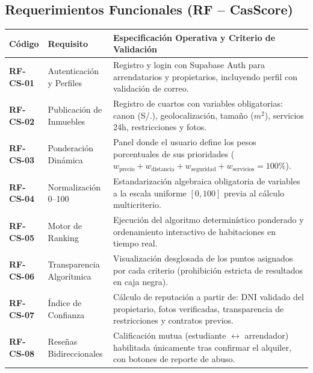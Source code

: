 \documentclass[11pt,a4paper]{article}
\begin{document}
\subsection{Requerimientos Funcionales (RF -- CasScore)}
\noindent\begin{tabularx}{\textwidth}{p{2.3cm} p{4.6cm} X}
\toprule
\textbf{Código} & \textbf{Requisito} & \textbf{Especificación Operativa y Criterio de Validación} \\
\midrule
\textbf{RF-CS-01} & Autenticación y Perfiles & Registro y login con Supabase Auth para arrendatarios y propietarios, incluyendo perfil con validación de correo. \\
\addlinespace[3pt]
\textbf{RF-CS-02} & Publicación de Inmuebles & Registro de cuartos con variables obligatorias: canon (S/.), geolocalización, tamaño ($m^2$), servicios 24h, restricciones y fotos. \\
\addlinespace[3pt]
\textbf{RF-CS-03} & Ponderación Dinámica & Panel donde el usuario define los pesos porcentuales de sus prioridades ($w_{\text{precio}} + w_{\text{distancia}} + w_{\text{seguridad}} + w_{\text{servicios}} = 100\%$). \\
\addlinespace[3pt]
\textbf{RF-CS-04} & Normalización 0--100 & Estandarización algebraica obligatoria de variables a la escala uniforme $[0, 100]$ previa al cálculo multicriterio. \\
\addlinespace[3pt]
\textbf{RF-CS-05} & Motor de Ranking & Ejecución del algoritmo determinístico ponderado y ordenamiento interactivo de habitaciones en tiempo real. \\
\addlinespace[3pt]
\textbf{RF-CS-06} & Transparencia Algorítmica & Visualización desglosada de los puntos asignados por cada criterio (prohibición estricta de resultados en caja negra). \\
\addlinespace[3pt]
\textbf{RF-CS-07} & Índice de Confianza & Cálculo de reputación a partir de: DNI validado del propietario, fotos verificadas, transparencia de restricciones y contratos previos. \\
\addlinespace[3pt]
\textbf{RF-CS-08} & Reseñas Bidireccionales & Calificación mutua (estudiante $\leftrightarrow$ arrendador) habilitada únicamente tras confirmar el alquiler, con botones de reporte de abuso. \\
\bottomrule
\end{tabularx}

\clearpage

\end{document}
